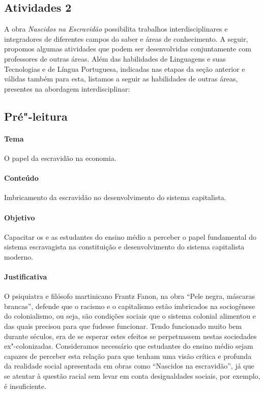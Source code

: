 \documentclass[11pt]{extarticle}
\begin{document}
\begin{enumerate}
\begin{enumerate}
\begin{enumerate}


\section{Atividades 2}

A obra \emph{Nascidos na Escravidão} possibilita trabalhos
interdisciplinares e integradores de diferentes campos do saber e áreas
de conhecimento. A seguir, propomos algumas atividades que podem ser
desenvolvidas conjuntamente com professores de outras áreas. Além das
habilidades de Linguagens e suas Tecnologias e de Língua Portuguesa,
indicadas nas etapas da seção anterior e válidas também para esta,
listamos a seguir as habilidades de outras áreas, presentes na abordagem
interdisciplinar:

\subsection{Pré"-leitura}


\paragraph{Tema} O papel da escravidão na economia.

\paragraph{Conteúdo} Imbricamento da escravidão no desenvolvimento do sistema capitalista.

\paragraph{Objetivo} Capacitar os e as estudantes do ensino médio a perceber o papel fundamental
do sistema escravagista na constituição e desenvolvimento do sistema capitalista moderno.

\paragraph{Justificativa} O psiquiatra e filósofo martinicano Frantz Fanon, na obra ``Pele negra,
máscaras brancas'', defende que o racismo e o capitalismo estão imbricados na sociogênese 
do colonialismo, ou seja, são condições sociais que o sistema colonial alimentou e das 
quais precisou para que fudesse funcionar. Tendo funcionado muito bem durante séculos, 
era de se esperar estes efeitos se perpetuassem nestas sociedades ex"-colonizadas. 
Consideramos necessário que estudantes do ensino médio sejam capazes de perceber 
esta relação para que tenham uma visão crítica e profunda da realidade social
apresentada em obras como ``Nascidos na escravidão'', já que se atentar à questão
racial sem levar em conta desigualdades sociais, por exemplo, é insuficiente. 


\end{enumerate}
\end{enumerate}
\end{enumerate}
\end{document}
